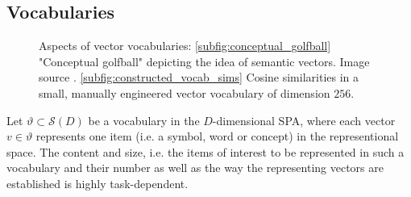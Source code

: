 \subsection{Vocabularies}
\label{subsec:vocabs}
\begin{figure}[t!]
	\centering
	\caption{Aspects of vector vocabularies: \ref{subfig:conceptual_golfball} "Conceptual golfball" depicting the idea of semantic vectors. Image source \cite{Eliasmith2013}. \ref{subfig:constructed_vocab_sims} Cosine similarities in a small, manually engineered vector vocabulary of dimension $256$.}\label{fig:vector vocabs}
\end{figure}
Let $\vartheta \subset \mathcal{S}(D)$ be a vocabulary in the $D$-dimensional \ac{SPA}, where each vector $v \in \vartheta$ represents one item (i.e. a symbol, word or concept) in the representional space.
The content and size, i.e. the items of interest to be represented in such a vocabulary and their number as well as the way the representing vectors are established is highly task-dependent.
